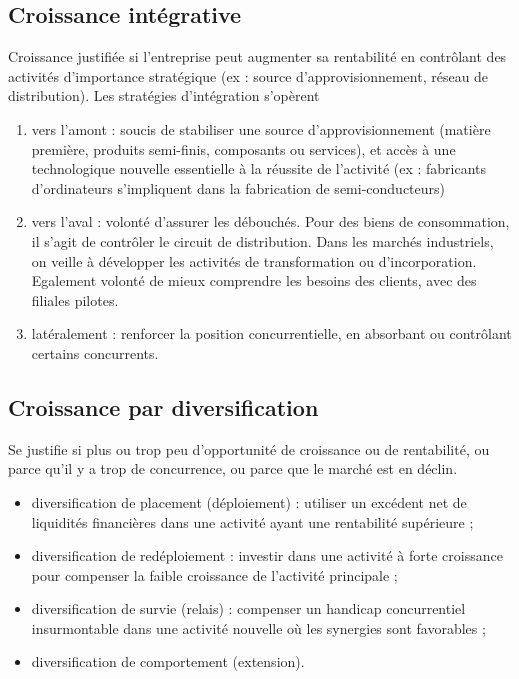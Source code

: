 		\subsection{Croissance intégrative}
		
		Croissance justifiée si l'entreprise peut augmenter sa rentabilité en contrôlant des activités d'importance stratégique (ex : source d'approvisionnement, réseau de distribution). Les stratégies d'intégration s'opèrent
		
		\begin{enumerate}
			\item vers l'amont : soucis de stabiliser une source d'approvisionnement (matière première, produits semi-finis, composants ou services), et accès à une technologique nouvelle essentielle à la réussite de l'activité (ex : fabricants d'ordinateurs s'impliquent dans la fabrication de semi-conducteurs)
			\item vers l'aval : volonté d'assurer les débouchés. Pour des biens de consommation, il s'agit de contrôler le circuit de distribution. Dans les marchés industriels, on veille à développer les activités de transformation ou d'incorporation. Egalement volonté de mieux comprendre les besoins des clients, avec des filiales pilotes.
			\item latéralement : renforcer la position concurrentielle, en absorbant ou contrôlant certains concurrents.
		\end{enumerate}
		
		
		\subsection{Croissance par diversification}
		
		Se justifie si plus ou trop peu d'opportunité de croissance ou de rentabilité, ou parce qu'il y a trop de concurrence, ou parce que le marché est en déclin.
		
		\begin{itemize}
			\item diversification de placement (déploiement) : utiliser un excédent net de liquidités financières dans une activité ayant une rentabilité supérieure ;
			\item diversification de redéploiement : investir dans une activité à forte croissance pour compenser la faible croissance de l'activité principale ;
			\item diversification de survie (relais) : compenser un handicap concurrentiel insurmontable dans une activité nouvelle où les synergies sont favorables ;
			\item diversification de comportement (extension).
		\end{itemize}
		
